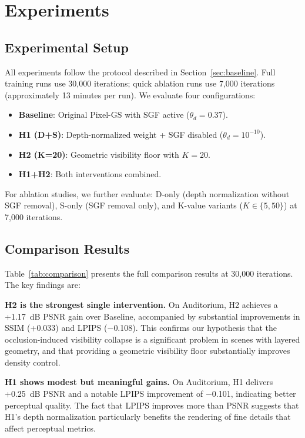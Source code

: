 \documentclass[conference]{IEEEtran}
\begin{document}
\section{Experiments}

\subsection{Experimental Setup}

All experiments follow the protocol described in Section~\ref{sec:baseline}. Full training runs use 30,000 iterations; quick ablation runs use 7,000 iterations (approximately 13 minutes per run). We evaluate four configurations:

\begin{itemize}
    \item \textbf{Baseline}: Original Pixel-GS with SGF active ($\theta_d = 0.37$).
    \item \textbf{H1 (D+S)}: Depth-normalized weight + SGF disabled ($\theta_d = 10^{-10}$).
    \item \textbf{H2 (K=20)}: Geometric visibility floor with $K = 20$.
    \item \textbf{H1+H2}: Both interventions combined.
\end{itemize}

For ablation studies, we further evaluate: D-only (depth normalization without SGF removal), S-only (SGF removal only), and K-value variants ($K \in \{5, 50\}$) at 7,000 iterations.

\subsection{Comparison Results}

Table~\ref{tab:comparison} presents the full comparison results at 30,000 iterations. The key findings are:

\textbf{H2 is the strongest single intervention.} On Auditorium, H2 achieves a +1.17~dB PSNR gain over Baseline, accompanied by substantial improvements in SSIM (+0.033) and LPIPS ($-$0.108). This confirms our hypothesis that the occlusion-induced visibility collapse is a significant problem in scenes with layered geometry, and that providing a geometric visibility floor substantially improves density control.

\textbf{H1 shows modest but meaningful gains.} On Auditorium, H1 delivers +0.25~dB PSNR and a notable LPIPS improvement of $-$0.101, indicating better perceptual quality. The fact that LPIPS improves more than PSNR suggests that H1's depth normalization particularly benefits the rendering of fine details that affect perceptual metrics.
\end{document}

